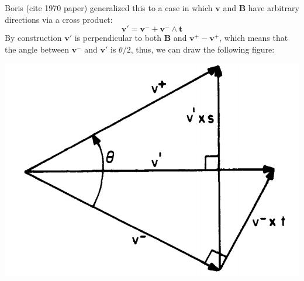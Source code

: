 \documentclass[12pt]{article}
\begin{document}
Boris (cite 1970 paper) generalized this to a case in which $\textbf{v}$ and $\textbf{B}$ have arbitrary directions via a cross product:
\begin{equation}\label{borisv'}
\textbf{v}'=\textbf{v}^-+\textbf{v}^-\wedge\textbf{t}
\end{equation}
By construction $\textbf{v}'$ is perpendicular to both $\textbf{B}$ and $\textbf{v}^+-\textbf{v}^+$, which means that the angle between $\textbf{v}^-$ and $\textbf{v}'$ is $\theta/2$, thus, we can draw the following figure:

\includegraphics[scale=0.4]{vprimerot}
\end{document}
